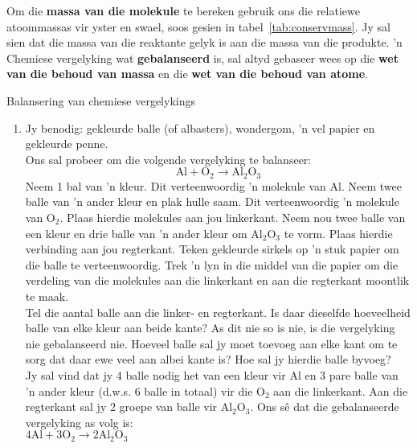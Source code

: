 Om die \textbf{massa van die molekule} te bereken gebruik ons die relatiewe atoommassas vir yster en swael, soos gesien in tabel~\ref{tab:conservmass}. Jy sal sien dat die massa van die reaktante gelyk is aan die massa van die produkte.  'n Chemiese vergelyking wat \textbf{gebalanseerd} is, sal altyd gebaseer wees op die \textbf{wet van die behoud van massa} en die \textbf{wet van die behoud van atome}.  
      \label{m38726*eip-619}
            \begin{activity}{Balansering van chemiese vergelykings}
            \nopagebreak
\begin{enumerate}[noitemsep, label=\textbf{\arabic*}]
\item            \label{m38726*eip-695}Jy benodig: gekleurde balle (of albasters), wondergom, 'n vel papier en gekleurde penne.\\
Ons sal probeer om die volgende vergelyking te balanseer:
\label{m38726*eid0342}\nopagebreak\noindent{}
    \begin{equation*}
    \text{Al}+{\text{O}}_{2}\to {\text{Al}}_{2}{\text{O}}_{3}
      \end{equation*}
Neem 1 bal van 'n kleur. Dit verteenwoordig 'n molekule van $\text{Al}$. Neem twee balle van 'n ander kleur en plak hulle saam. Dit verteenwoordig 'n molekule van ${\text{O}}_{2}$. Plaas hierdie molekules aan jou linkerkant. Neem nou twee balle van een kleur en drie balle van 'n ander kleur om ${\text{Al}}_{2}{\text{O}}_{3}$ te vorm. Plaas hierdie verbinding aan jou regterkant. Teken gekleurde sirkels op 'n stuk papier om die balle te verteenwoordig. Trek 'n lyn in die middel van die papier om die verdeling van die molekules aan die linkerkant en aan die regterkant moontlik te maak.\\
Tel die aantal balle aan die linker- en regterkant. Is daar dieselfde hoeveelheid balle van elke kleur aan beide kante? As dit nie so is nie, is  die vergelyking nie gebalanseerd nie. Hoeveel balle sal jy moet toevoeg aan elke kant om te sorg dat daar ewe veel aan albei kante is? Hoe sal jy hierdie balle byvoeg?\\
Jy sal vind dat jy  4 balle nodig het van een kleur vir $\text{Al}$ en 3 pare balle van 'n ander kleur (d.w.s. 6 balle in totaal) vir die ${\text{O}}_{2}$ aan die linkerkant. Aan die regterkant sal jy  2 groepe van balle vir ${\text{Al}}_{2}{\text{O}}_{3}$. Ons s\^{e} dat die  gebalanseerde vergelyking as volg is:\\
    $4\text{Al}+3{\text{O}}_{2}\to 2{\text{Al}}_{2}{\text{O}}_{3}$


\end{enumerate}
\end{activity}
